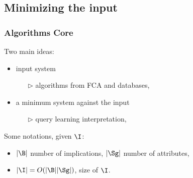
\begin{comment}
1 slide for both approach
define L' base as minimum, equivalent and nonredundant wrt L
\end{comment}


\subsection{Minimizing the input}

\begin{frame}
\frametitle{Algorithms Core}

Two main ideas:
\begin{itemize}
	\item {} input system
	\begin{itemize}
		\item[\color{belize} $\triangleright$] algorithms from FCA and databases,
	\end{itemize}
	
	\item {} a minimum system against the input
	\begin{itemize}
		\item[\color{belize} $\triangleright$] query learning interpretation, 
	\end{itemize}
\end{itemize}

\vspace{1.2em}

Some notations, given $\I$:
\begin{itemize}
	\item $|\B|$ number of implications, $|\Sg|$ number of attributes,
	\item $|\I| = O(|\B||\Sg|)$, size of $\I$. 
\end{itemize}

\end{frame}

